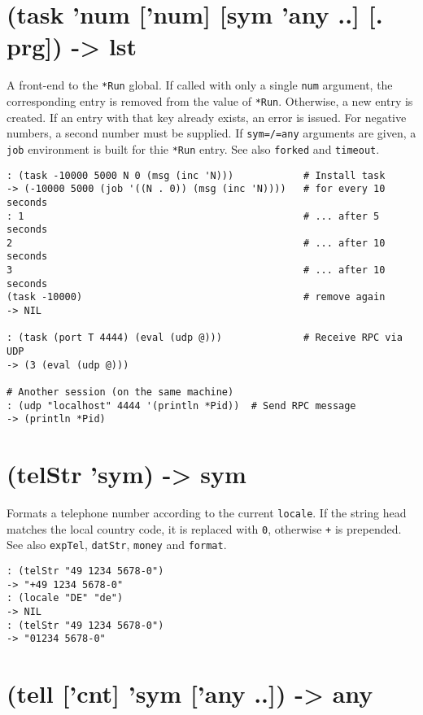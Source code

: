 {{{{{{{{ 
\section{(task 'num ['num] [sym 'any ..] [. prg]) -> lst}
\label{sec-8-1-20-9}


A front-end to the \texttt{*Run} global. If called with only a single \texttt{num}
argument, the corresponding entry is removed from the value of \texttt{*Run}.
Otherwise, a new entry is created. If an entry with that key already
exists, an error is issued. For negative numbers, a second number must
be supplied. If \texttt{sym=/=any} arguments are given, a \texttt{job} environment is
built for thie \texttt{*Run} entry. See also \texttt{forked} and \texttt{timeout}.


\begin{verbatim}
: (task -10000 5000 N 0 (msg (inc 'N)))            # Install task
-> (-10000 5000 (job '((N . 0)) (msg (inc 'N))))   # for every 10 seconds
: 1                                                # ... after 5 seconds
2                                                  # ... after 10 seconds
3                                                  # ... after 10 seconds
(task -10000)                                      # remove again
-> NIL

: (task (port T 4444) (eval (udp @)))              # Receive RPC via UDP
-> (3 (eval (udp @)))

# Another session (on the same machine)
: (udp "localhost" 4444 '(println *Pid))  # Send RPC message
-> (println *Pid)
\end{verbatim}

 
\section{(telStr 'sym) -> sym}
\label{sec-8-1-20-10}


Formats a telephone number according to the current \texttt{locale}. If the
string head matches the local country code, it is replaced with \texttt{0},
otherwise \texttt{+} is prepended. See also \texttt{expTel}, \texttt{datStr}, \texttt{money} and
\texttt{format}.


\begin{verbatim}
: (telStr "49 1234 5678-0")
-> "+49 1234 5678-0"
: (locale "DE" "de")
-> NIL
: (telStr "49 1234 5678-0")
-> "01234 5678-0"
\end{verbatim}

 
\section{(tell ['cnt] 'sym ['any ..]) -> any}
\label{sec-8-1-20-11}


}}}}}}}}

